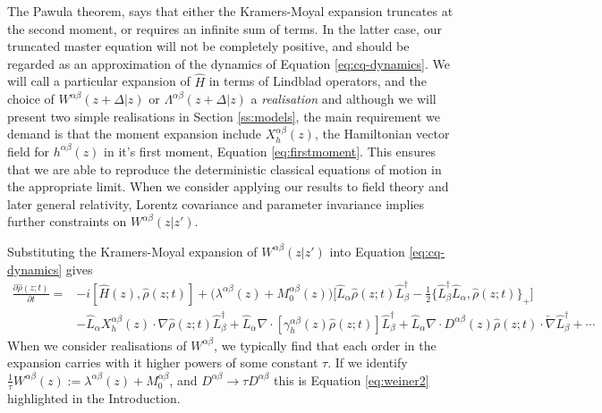 \documentclass[aps,pra,showpacs,citeautoscript,amsmath,amssymb,floatfix,superscriptaddress,bbm, verbatim,amsfonts,changes,12pt,nofootinbib,longbibliography]{revtex4-2}
\def\X{\Lambda}
\def\z{{z}}
\def\L{{\hat{L}}}
\def\Hq{\hat{H}}
\def\dist{{\Delta}}
\def\rate{{W}}
\def\linrate{{\lambda}}
\def\ab{^{\alpha\beta}}
\newcommand{\M}[1]{M_{#1}\ab}
\renewcommand{\varrho}{\hat{\rho}}
\def\psiz{{\varrho(\z;t)}}
\def\friction{\gamma}
\begin{document}
The Pawula theorem\cite{pawula1967rf}, says that either the Kramers-Moyal expansion truncates at the second moment, or requires an infinite sum of terms.  In the latter case, our truncated master equation will not be completely positive, and should be regarded as an approximation of the dynamics of Equation \eqref{eq:cq-dynamics}.
We will call a particular expansion of $\Hq$ in terms of Lindblad operators, and the choice of $\rate^{\alpha\beta}(\z+\dist|\z)$ or $\X^{\alpha\beta}(\z+\dist|\z)$ a {\it realisation} 
and although we will present two simple realisations in Section \ref{ss:models},
the main requirement we demand is that the moment expansion include $X^{\alpha\beta}_h(\z)$, the Hamiltonian vector field for $h^{\alpha\beta}(\z)$ in it's first moment, Equation \eqref{eq:firstmoment}. This ensures that we are able to reproduce the deterministic classical equations of motion in the appropriate limit. When we consider applying our results to field theory and later general relativity,  Lorentz covariance and parameter invariance implies further constraints on $\rate\ab(\z|\z')$. 

Substituting the Kramers-Moyal expansion of $\rate^{\alpha\beta}(\z|\z')$ into Equation \eqref{eq:cq-dynamics}
gives 
\begin{align}
  \frac{\partial\psiz}{\partial t}=
  &-i[\Hq(\z),\psiz]
 + 
 \big(\linrate\ab(\z) +
  \M{0}(\z)\big)\Big[\L_{\alpha}\psiz\L_{\beta}^\dagger
  -\frac{1}{2}
\{\L_{\beta}^\dagger\L_{\alpha},\psiz\}_+   
\Big]
\nonumber\\
&-
\L_{\alpha}X^{\alpha\beta}_h(\z)\cdot\nabla \psiz\L_{\beta}^\dagger
+ 
\L_{\alpha}\nabla \cdot[\friction\ab_h(\z)\psiz]\L_{\beta}^\dagger
+
\L_{\alpha}
\nabla\cdot D^{\alpha\beta}(\z)\psiz\cdot\overleftarrow{\nabla}\L_{\beta}^\dagger
  +\cdots
  \nonumber
\end{align}
When we consider realisations of $\rate\ab$, we typically find that each order in the expansion carries with it higher powers of some constant $\tau$. If we identify
$\frac{1}{\tau}\rate\ab(\z):=\linrate\ab(\z)+\M{0}$, and $D\ab\rightarrow \tau D\ab$ this is Equation \eqref{eq:weiner2} highlighted in the Introduction.
\end{document}
